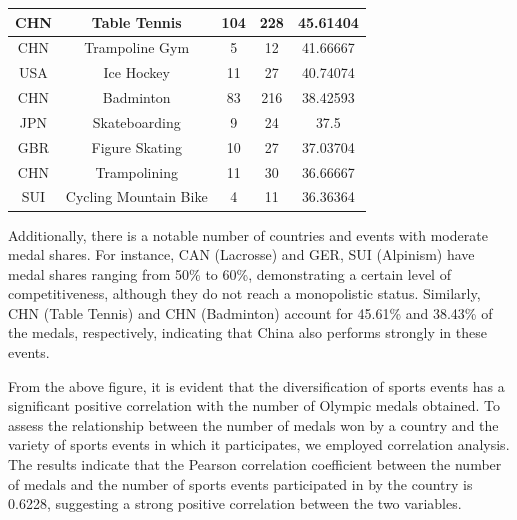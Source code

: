 \documentclass{mcmthesis}
\begin{document}
\begin{table}[H]
\begin{tabular}{|c|c|c|c|c|}
\hline
CHN              & Table Tennis          & 104                     & 228                            & 45.61404                 \\ 
\hline
CHN              & Trampoline Gym        & 5                       & 12                             & 41.66667                 \\ 
\hline
USA              & Ice Hockey            & 11                      & 27                             & 40.74074                 \\ 
\hline
CHN              & Badminton             & 83                      & 216                            & 38.42593                 \\ 
\hline
JPN              & Skateboarding         & 9                       & 24                             & 37.5                     \\ 
\hline
GBR              & Figure Skating        & 10                      & 27                             & 37.03704                 \\ 
\hline
CHN              & Trampolining          & 11                      & 30                             & 36.66667                 \\ 
\hline
SUI              & Cycling Mountain Bike & 4                       & 11                             & 36.36364                 \\
\hline
\end{tabular}
\end{table}
Additionally, there is a notable number of countries and events with moderate medal shares. For instance, CAN (Lacrosse) and GER, SUI (Alpinism) have medal shares ranging from 50\% to 60\%, demonstrating a certain level of competitiveness, although they do not reach a monopolistic status. Similarly, CHN (Table Tennis) and CHN (Badminton) account for 45.61\% and 38.43\% of the medals, respectively, indicating that China also performs strongly in these events.

From the above figure, it is evident that the diversification of sports events has a significant positive correlation with the number of Olympic medals obtained. To assess the relationship between the number of medals won by a country and the variety of sports events in which it participates, we employed correlation analysis. The results indicate that the Pearson correlation coefficient between the number of medals and the number of sports events participated in by the country is 0.6228, suggesting a strong positive correlation between the two variables.
\end{document}
